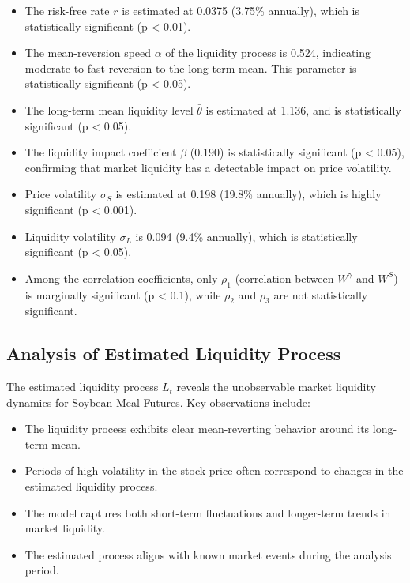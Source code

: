 \documentclass[12pt,a4paper]{article}
\begin{document}
\begin{itemize}
    \item The risk-free rate $r$ is estimated at 0.0375 (3.75\% annually), which is statistically significant (p < 0.01).
    
    \item The mean-reversion speed $\alpha$ of the liquidity process is 0.524, indicating moderate-to-fast reversion to the long-term mean. This parameter is statistically significant (p < 0.05).
    
    \item The long-term mean liquidity level $\bar{\theta}$ is estimated at 1.136, and is statistically significant (p < 0.05).
    
    \item The liquidity impact coefficient $\beta$ (0.190) is statistically significant (p < 0.05), confirming that market liquidity has a detectable impact on price volatility.
    
    \item Price volatility $\sigma_S$ is estimated at 0.198 (19.8\% annually), which is highly significant (p < 0.001).
    
    \item Liquidity volatility $\sigma_L$ is 0.094 (9.4\% annually), which is statistically significant (p < 0.05).
    
    \item Among the correlation coefficients, only $\rho_1$ (correlation between $W^{\gamma}$ and $W^S$) is marginally significant (p < 0.1), while $\rho_2$ and $\rho_3$ are not statistically significant.
\end{itemize}

\subsection{Analysis of Estimated Liquidity Process}

The estimated liquidity process $L_t$ reveals the unobservable market liquidity dynamics for Soybean Meal Futures. Key observations include:

\begin{itemize}
    \item The liquidity process exhibits clear mean-reverting behavior around its long-term mean.
    
    \item Periods of high volatility in the stock price often correspond to changes in the estimated liquidity process.
    
    \item The model captures both short-term fluctuations and longer-term trends in market liquidity.
    
    \item The estimated process aligns with known market events during the analysis period.
\end{itemize}
\end{document}
